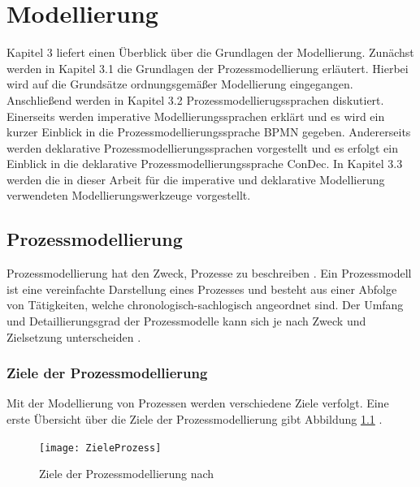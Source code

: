 
\chapter{Modellierung}\label{sec:chapter3}
Kapitel 3 liefert einen Überblick über die Grundlagen der Modellierung. Zunächst werden in Kapitel 3.1 die Grundlagen der Prozessmodellierung erläutert. Hierbei wird auf die Grundsätze ordnungsgemäßer Modellierung eingegangen. Anschließend werden in Kapitel 3.2 Prozessmodellierugssprachen diskutiert. Einerseits werden imperative Modellierungssprachen erklärt und es wird ein kurzer Einblick in die Prozessmodellierungssprache BPMN gegeben. Andererseits werden deklarative Prozessmodellierungssprachen vorgestellt und es erfolgt ein Einblick in die deklarative Prozessmodellierungssprache ConDec. In Kapitel 3.3 werden die in dieser Arbeit für die imperative und deklarative Modellierung verwendeten Modellierungswerkzeuge vorgestellt.

\section{Prozessmodellierung}\label{sec:chapter3:Prozessmodellierung}

Prozessmodellierung hat den Zweck, Prozesse zu beschreiben \cite{fahland2009}. Ein Prozessmodell ist eine vereinfachte Darstellung eines Prozesses und besteht aus einer Abfolge von Tätigkeiten, welche chronologisch-sachlogisch angeordnet sind. Der Umfang und Detaillierungsgrad der Prozessmodelle kann sich je nach Zweck und Zielsetzung unterscheiden \cite{koch2011}.

\subsection{Ziele der Prozessmodellierung}
Mit der Modellierung von Prozessen werden verschiedene Ziele verfolgt. Eine erste Übersicht über die Ziele der Prozessmodellierung gibt Abbildung \ref{fig:ZieleProzess} \cite{koch2011}.
\begin{figure}[htp]
\begin{center}
  \texttt{[image: ZieleProzess]} %
  \caption{Ziele der Prozessmodellierung nach \cite{koch2011}}
  \label{fig:ZieleProzess}
\end{center}
\end{figure}

